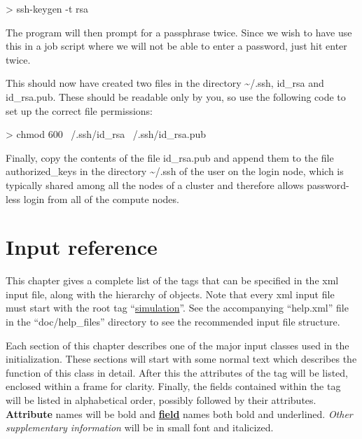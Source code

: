 \documentclass[11pt,english,fleqn]{report}
\newenvironment{code}{%
\footnotesize 
\verbatim
}{
\endverbatim
\normalsize
}
\begin{document}
\begin{code}
> ssh-keygen -t rsa
\end{code}

\noindent The program will then prompt for a passphrase twice. Since we wish to have
use this in a job script where we will not be able to enter a password,
just hit enter twice. 

This should now have created two files in the directory \textasciitilde{}/.ssh,
id\_rsa and id\_rsa.pub. These should be readable only by you, so
use the following code to set up the correct file permissions:

\begin{code}
> chmod 600 ~/.ssh/id_rsa ~/.ssh/id_rsa.pub
\end{code}

\noindent Finally, copy the contents of the file id\_rsa.pub and append them
to the file authorized\_keys in the directory \textasciitilde{}/.ssh
of the user on the login node, which is typically shared among all
the nodes of a cluster and therefore allows password-less login 
from all of the compute nodes.


\chapter{Input reference}

\label{hierarchy}

This chapter gives a complete list of the tags that can be
specified in the xml input file, along with the hierarchy of objects.
Note that every xml input file must start with the root tag 
{}``\hyperref[SIMULATION]{simulation}''. 
See the accompanying {}``help.xml'' file in the {}``doc/help\_files'' directory
to see the recommended input file structure.

Each section of this chapter describes one of the major input classes
used in the \ipi initialization. These sections will start with some normal
text which describes the function of this class in detail.
After this the attributes of the tag will be listed, enclosed within
a frame for clarity.
Finally, the fields contained within the tag will be listed in alphabetical order,
possibly followed by their attributes.
\textbf{Attribute} names will be bold and 
\textbf{\underline{field}} names both bold and underlined.
\emph{\small Other supplementary information} will be in small font and italicized.

























\end{document}
